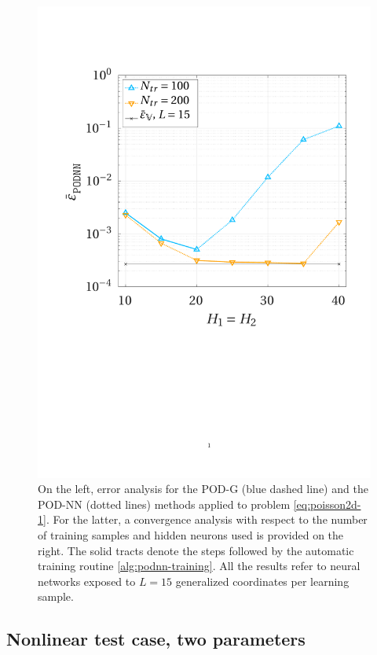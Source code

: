 \documentclass[12pt, a4paper, twoside, openright, notitlepage]{report}
\numberwithin{equation}{chapter}
\theoremstyle{theorem}
\theoremstyle{definition}
\theoremstyle{remark}
\theoremstyle{proposition}
\numberwithin{figure}{chapter}
\begin{document}
\begin{figure}[H]
			\includegraphics[scale = 0.39, trim = {1.5cm 9cm 1.5cm 3.5cm}, clip]{poisson2d_1_nn_convergence}
			
			\caption{On the left, error analysis for the POD-G (blue dashed line) and the POD-NN (dotted lines) methods applied to problem \eqref{eq:poisson2d-1}. For the latter, a convergence analysis with respect to the number of training samples and hidden neurons used is provided on the right. The solid tracts denote the steps followed by the automatic training routine \ref{alg:podnn-training}. All the results refer to neural networks exposed to $L = 15$ generalized coordinates per learning sample.}
			\label{fig:poisson2d-1-fig2}
		\end{figure}
		
	\subsection{Nonlinear test case, two parameters}
	\label{section:poisson2d-2}
	
\end{document}
